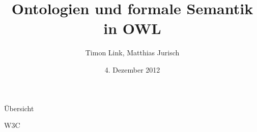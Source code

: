 \documentclass{beamer}
\title[OWL]{Ontologien und formale Semantik in OWL}
\author{Timon Link, Matthias Jurisch}
\date{4. Dezember 2012}
\begin{document}
\begin{frame}
\titlepage
\end{frame}

\begin{frame}{Übersicht}
\end{frame}

\begin{frame}{W3C}
\end{frame}







\end{document}
